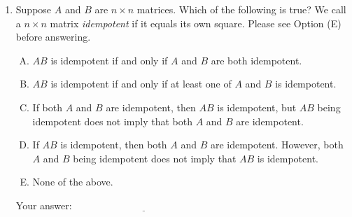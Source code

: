 \documentclass[10pt]{amsart}
\begin{document}
\begin{enumerate}
\item Suppose $A$ and $B$ are $n \times n$ matrices. Which of the
  following is true? We call a $n \times n$ matrix {\em idempotent} if
  it equals its own square. Please see Option (E) before answering.

  \begin{enumerate}[(A)]
  \item $AB$ is idempotent if and only if $A$ and $B$ are both idempotent.
  \item $AB$ is idempotent if and only if at least one of $A$ and $B$ is idempotent.
  \item If both $A$ and $B$ are idempotent, then $AB$ is idempotent, but
    $AB$ being idempotent does not imply that both $A$ and $B$ are
    idempotent.
  \item If $AB$ is idempotent, then both $A$ and $B$ are
    idempotent. However, both $A$ and $B$ being idempotent does not
    imply that $AB$ is idempotent.
  \item None of the above.
  \end{enumerate}

  \vspace{0.1in}
  Your answer: $\underline{\qquad\qquad\qquad\qquad\qquad\qquad\qquad}$
  \vspace{0.1in}

\end{enumerate}
\end{document}
